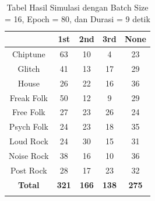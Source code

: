 \begin{longtable}[c]{|c|c|c|c|c|}
	\hline
	\textbf{}      & \textbf{1st} & \textbf{2nd} & \textbf{3rd} & \textbf{None} \\ \hline
	\endfirsthead
	\endhead
	Chiptune       & 63           & 10           & 4            & 23            \\ \hline
	Glitch         & 41           & 13           & 17           & 29            \\ \hline
	House          & 26           & 22           & 16           & 36            \\ \hline
	Freak Folk     & 50           & 12           & 9            & 29            \\ \hline
	Free Folk      & 27           & 23           & 26           & 24            \\ \hline
	Psych Folk     & 24           & 23           & 18           & 35            \\ \hline
	Loud Rock      & 24           & 30           & 15           & 31            \\ \hline
	Noise Rock     & 38           & 16           & 10           & 36            \\ \hline
	Post Rock      & 28           & 17           & 23           & 32            \\ \hline
	\textbf{Total} & \textbf{321} & \textbf{166} & \textbf{138} & \textbf{275}  \\ \hline
	\caption{Tabel Hasil Simulasi dengan Batch Size = 16, Epoch = 80, dan Durasi = 9 detik}
	\label{tab:my-table}\\
\end{longtable}

